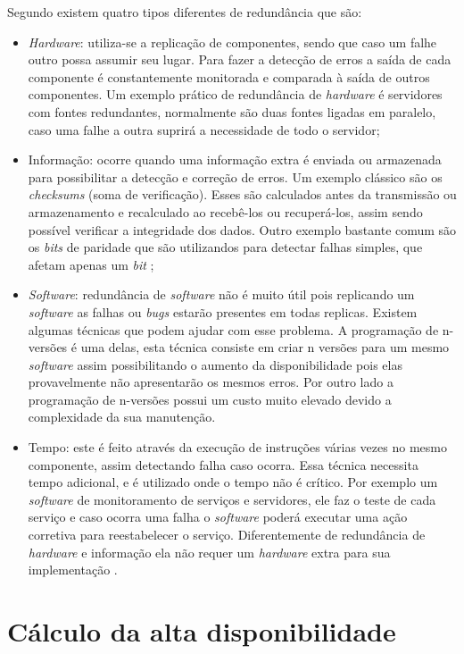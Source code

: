 Segundo \cite{norvag2000} existem quatro tipos diferentes de redundância que são:
\begin{itemize}
 \item \textit{Hardware}: utiliza-se a replicação de componentes, sendo que caso um falhe outro possa assumir seu lugar. 
 Para fazer a detecção de erros a saída de cada componente é constantemente monitorada e comparada à saída de outros componentes.
 Um exemplo prático de redundância de \textit{hardware} é servidores com fontes redundantes, normalmente são duas fontes ligadas em paralelo, 
 caso uma falhe a outra suprirá a necessidade de todo o servidor;
 \item Informação: ocorre quando uma informação extra é enviada ou armazenada para possibilitar a detecção e correção de erros.
 Um exemplo clássico são os \textit{checksums} (soma de verificação). Esses são calculados antes da transmissão ou armazenamento 
 e recalculado ao recebê-los ou recuperá-los, assim sendo possível verificar a integridade dos dados. Outro exemplo bastante comum são os 
 \textit{bits} de paridade que são utilizandos para detectar falhas simples, que afetam apenas um \textit{bit} \cite{weber2002};
 \item \textit{Software}: redundância de \textit{software} não é muito útil pois replicando um \textit{software} as falhas ou 
 \textit{bugs} estarão presentes em todas replicas. Existem algumas técnicas que podem ajudar com esse problema. A programação 
 de n-versões é uma delas, esta técnica consiste em criar n versões para um mesmo \textit{software} assim possibilitando o aumento da 
 disponibilidade pois elas provavelmente não apresentarão os mesmos erros. Por outro lado a programação de n-versões possui um custo muito 
 elevado devido a complexidade da sua manutenção.
 \item Tempo: este é feito através da execução de instruções várias vezes no mesmo componente, assim detectando falha caso ocorra.
 Essa técnica necessita tempo adicional, e é utilizado onde o tempo não é crítico. Por exemplo um \textit{software} de monitoramento de serviços e
 servidores, ele faz o teste de cada serviço e caso ocorra uma falha o \textit{software} poderá executar uma ação corretiva para reestabelecer o
 serviço. Diferentemente de redundância de \textit{hardware} e informação ela não requer um \textit{hardware} extra para sua implementação 
 \cite{costa2009}.
\end{itemize}

\section{Cálculo da alta disponibilidade}

